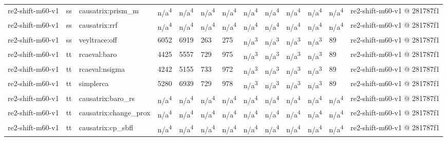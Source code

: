 \begin{table}[t]
\begin{tabular}{lllllllllllll}
re2-shift-m60-v1 & ss & causatrix:prism\_m & n/a\textsuperscript{4} & n/a\textsuperscript{4} & n/a\textsuperscript{4} & n/a\textsuperscript{4} & n/a\textsuperscript{4} & n/a\textsuperscript{4} & n/a\textsuperscript{4} & n/a\textsuperscript{4} & n/a\textsuperscript{4} & re2-shift-m60-v1 @ 281787f1 \\
re2-shift-m60-v1 & ss & causatrix:rrf & n/a\textsuperscript{4} & n/a\textsuperscript{4} & n/a\textsuperscript{4} & n/a\textsuperscript{4} & n/a\textsuperscript{4} & n/a\textsuperscript{4} & n/a\textsuperscript{4} & n/a\textsuperscript{4} & n/a\textsuperscript{4} & re2-shift-m60-v1 @ 281787f1 \\
re2-shift-m60-v1 & ss & veyltrace:off & 6052 & 6919 & 263 & 275 & n/a\textsuperscript{3} & n/a\textsuperscript{3} & n/a\textsuperscript{3} & n/a\textsuperscript{3} & 89 & re2-shift-m60-v1 @ 281787f1 \\
re2-shift-m60-v1 & tt & rcaeval:baro & 4425 & 5557 & 729 & 975 & n/a\textsuperscript{3} & n/a\textsuperscript{3} & n/a\textsuperscript{3} & n/a\textsuperscript{3} & 89 & re2-shift-m60-v1 @ 281787f1 \\
re2-shift-m60-v1 & tt & rcaeval:nsigma & 4242 & 5155 & 733 & 972 & n/a\textsuperscript{3} & n/a\textsuperscript{3} & n/a\textsuperscript{3} & n/a\textsuperscript{3} & 89 & re2-shift-m60-v1 @ 281787f1 \\
re2-shift-m60-v1 & tt & simplerca & 5280 & 6939 & 729 & 978 & n/a\textsuperscript{3} & n/a\textsuperscript{3} & n/a\textsuperscript{3} & n/a\textsuperscript{3} & 89 & re2-shift-m60-v1 @ 281787f1 \\
re2-shift-m60-v1 & tt & causatrix:baro\_rs & n/a\textsuperscript{4} & n/a\textsuperscript{4} & n/a\textsuperscript{4} & n/a\textsuperscript{4} & n/a\textsuperscript{4} & n/a\textsuperscript{4} & n/a\textsuperscript{4} & n/a\textsuperscript{4} & n/a\textsuperscript{4} & re2-shift-m60-v1 @ 281787f1 \\
re2-shift-m60-v1 & tt & causatrix:change\_prox & n/a\textsuperscript{4} & n/a\textsuperscript{4} & n/a\textsuperscript{4} & n/a\textsuperscript{4} & n/a\textsuperscript{4} & n/a\textsuperscript{4} & n/a\textsuperscript{4} & n/a\textsuperscript{4} & n/a\textsuperscript{4} & re2-shift-m60-v1 @ 281787f1 \\
re2-shift-m60-v1 & tt & causatrix:cp\_sbfl & n/a\textsuperscript{4} & n/a\textsuperscript{4} & n/a\textsuperscript{4} & n/a\textsuperscript{4} & n/a\textsuperscript{4} & n/a\textsuperscript{4} & n/a\textsuperscript{4} & n/a\textsuperscript{4} & n/a\textsuperscript{4} & re2-shift-m60-v1 @ 281787f1 \\

\end{tabular}
\end{table}
